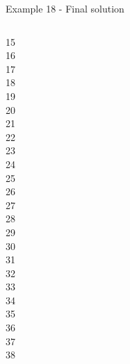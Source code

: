 \begin{frame}{Example 18 - Final solution}
\begin{columns}[t]
\begin{column}{0.3\textwidth}
15\\
16\\
17\\
18\\
19\\
20\\
21\\
22\\
23\\
24\\
25\\
26\\
27\\
28\\
29\\
30\\
31\\
32\\
33\\
34\\
35\\
36\\
37\\
38\\


\end{column}
\end{columns}
\end{frame}
